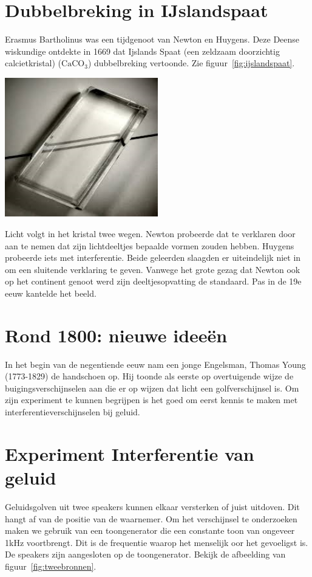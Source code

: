 \documentclass[../main.tex]{subfiles}
\begin{document}
\section{Dubbelbreking in IJslandspaat}
Erasmus Bartholinus was een tijdgenoot van Newton en Huygens. Deze Deense wiskundige ontdekte in 1669 dat Ijslands Spaat (een zeldzaam doorzichtig calcietkristal) ($\mathrm{CaCO_3}$) dubbelbreking vertoonde. Zie figuur~\ref{fig:ijslandspaat}.


\begin{center}
\leavevmode
\includegraphics[width=0.5\textwidth]{./img/ijslandspaat.png}
\end{center}

Licht volgt in het kristal twee wegen. Newton probeerde dat te verklaren door aan te nemen dat zijn lichtdeeltjes bepaalde vormen zouden hebben. Huygens probeerde iets met interferentie. Beide geleerden slaagden er uiteindelijk niet in om een sluitende verklaring te geven. Vanwege het grote gezag dat Newton ook op het continent genoot werd zijn deeltjesopvatting de standaard. Pas in de 19e eeuw kantelde het beeld.

\section{Rond 1800: nieuwe idee\"en}
In het begin van de negentiende eeuw nam een jonge Engelsman, Thomas Young (1773-1829) de handschoen op. Hij toonde als eerste op overtuigende wijze de buigingsverschijnselen aan die er op wijzen dat licht een golfverschijnsel is. Om zijn experiment te kunnen begrijpen is het goed om eerst kennis te maken met interferentieverschijnselen bij geluid.

\section{Experiment Interferentie van geluid}
Geluidsgolven uit twee speakers kunnen elkaar versterken of juist uitdoven. Dit hangt af van de positie van de waarnemer. Om het verschijnsel te onderzoeken maken we gebruik van een toongenerator die een constante toon van ongeveer 1kHz voortbrengt. Dit is de frequentie waarop het menselijk oor het gevoeligst is. De speakers zijn aangesloten op de toongenerator.
Bekijk de afbeelding van figuur~\ref{fig:tweebronnen}.
\end{document}
